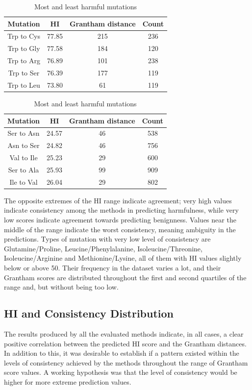 \documentclass[12pt,MSc,wordcount,anon]{muthesis}
\begin{document}
\begin{flushleft}
\begin{table}
\begin{center}
\begin{tabular}{|c|c|c|c|}\hline\hline
Mutation&HI&Grantham distance&Count\\\hline
Trp to Cys&77.85&215&236\\
Trp to Gly&77.58&184&120\\
Trp to Arg&76.89&101&238\\
Trp to Ser&76.39&177&119\\
Trp to Leu&73.80&61&119\\\hline\hline
\end{tabular}
\begin{tabular}{|c|c|c|c|}\hline\hline
Mutation&HI&Grantham distance&Count\\\hline
Ser to Asn&24.57&46&538\\
Asn to Ser&24.82&46&756\\
Val to Ile&25.23&29&600\\
Ser to Ala&25.93&99&909\\
Ile to Val&26.04&29&802\\\hline\hline
\end{tabular}
\end{center}
\caption{Most and least harmful mutations}\label{wombat}
\end{table}

The opposite extremes of the HI range indicate agreement; very high values indicate consistency among the methods in predicting harmfulness, while very low scores indicate agreement towards predicting benignness. Values near the middle of the range indicate the worst consistency, meaning ambiguity in the predictions. Types of mutation with very low level of consistency are Glutamine/Proline, Leucine/Phenylalanine, Isoleucine/Threonine, Isoleucine/Arginine and Methionine/Lysine, all of them with HI values slightly below or above 50. Their frequency in the dataset varies a lot, and their Grantham scores are distributed throughout the first and second quartiles of the range and, but without being too low.

\subsection{HI and Consistency Distribution}

The results produced by all the evaluated methods indicate, in all cases, a clear positive correlation between the predicted HI score and the Grantham distances. In addition to this, it was desirable to establish if a pattern existed within the levels of consistency achieved by the methods throughout the range of Grantham score values. A working hypothesis was that the level of consistency would be higher for more extreme prediction values.


\end{flushleft}
\end{document}
